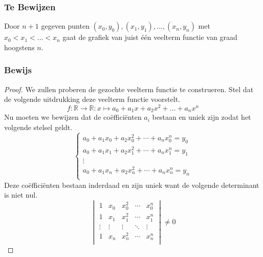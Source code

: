 \documentclass[lineaire_algebra_oplossingen.tex]{subfiles}
\begin{document}
\subsubsection*{Te Bewijzen}
Door $n+1$ gegeven punten $(x_0,y_0),(x_1,y_1),...,(x_n,y_n)$ met $x_0 < x_1 < ... < x_n$ gaat de grafiek van juist \'e\'en veelterm functie van graad hoogstens $n$.

\subsubsection*{Bewijs}
\begin{proof}
We zullen proberen de gezochte veelterm functie te construeren.
Stel dat de volgende uitdrukking deze veelterm functie voorstelt.
\[
f: \mathbb{R} \rightarrow \mathbb{R} : x \mapsto a_0 + a_1x + a_2x^2+...+a_nx^n
\]
Nu moeten we bewijzen dat de co\"effici\"enten $a_i$ bestaan en uniek zijn zodat het volgende stelsel geldt.
\[
\left\lbrace
\begin{array}{ c }
a_0 + a_1x_0 + a_2x_0^2 + \cdots + a_nx_0^n = y_0\\
a_0 + a_1x_1 + a_2x_1^2 + \cdots + a_nx_1^n = y_1\\
\vdots\\
a_0 + a_1x_n + a_2x_n^2 + \cdots + a_nx_n^n = y_n\\
\end{array}
\right.
\]
Deze co\"effici\"enten bestaan inderdaad en zijn uniek want de volgende determinant is niet nul.
\[
\begin{vmatrix}
1 & x_0 & x_0^2 & \cdots & x_0^n\\
1 & x_1 & x_1^2 & \cdots & x_1^n\\
\vdots & \vdots & \vdots & \ddots & \vdots \\
1 & x_n & x_n^2 & \cdots & x_n^n\\
\end{vmatrix}
\neq 0
\]
\end{proof}
\end{document}
